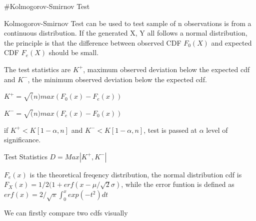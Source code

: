 \documentclass[
]{article}
\begin{document}
\#Kolmogorov-Smirnov Test

Kolmogorov-Smirnov Test can be used to test sample of n observations is
from a continuous distribution. If the generated X, Y all follows a
normal distribution, the principle is that the difference between
observed CDF \(F_0(X)\) and expected CDF \(F_e(X)\) should be small.

The test statistics are \(K^+\), maximum observed deviation below the
expected cdf and \(K^-\), the minimum observed deviation below the
expected cdf.

\(K^+ = \sqrt(n)max(F_0(x) - F_e(x))\)

\(K^- = \sqrt(n)max(F_e(x) - F_0(x))\)

if \(K^+ < K[1-\alpha, n]\) and \(K^- < K[1-\alpha, n]\), test is passed
at \(\alpha\) level of significance.

Test Statistics \(D = Max|K^+, K^-|\)

\(F_e(x)\) is the theoretical freqency distribution, the normal
distribution cdf is \(F_X(x) = 1/2(1+erf(x-\mu/\sqrt2\sigma)\), while
the error funtion is defined as
\(erf(x) = 2/\sqrt\pi \int_{0}^{x}exp(-t^2)dt\)

We can firstly compare two cdfs visually
\end{document}
